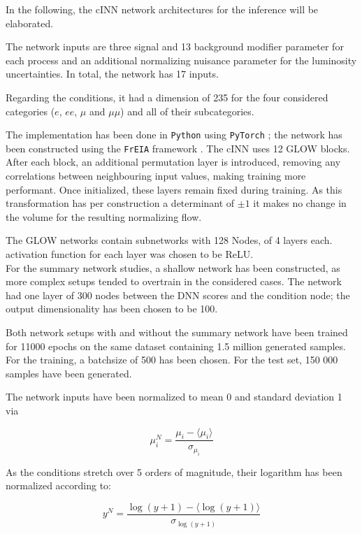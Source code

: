 
In the following, the cINN network architectures for the inference will be elaborated. 

The network inputs are three signal and 13 background modifier parameter for each process and an additional normalizing nuisance parameter for the luminosity uncertainties. In total, the network has 17 inputs.

Regarding the conditions, it had a dimension of 235 for the four considered categories ($e$, $ee$, $\mu$ and $\mu\mu$) and all of their subcategories.

The implementation has been done in \texttt{Python} using \texttt{PyTorch} \cite{pytorch}; the network has been constructed using the \texttt{FrEIA} framework \cite{freia}. The cINN uses 12 GLOW blocks. After each block, an additional permutation layer is introduced, removing any correlations between neighbouring input values, making training more performant. Once initialized, these layers remain fixed during training. As this transformation has per construction a determinant of $\pm1$ it makes no change in the volume for the resulting normalizing flow.

The GLOW networks contain subnetworks with 128 Nodes, of 4 layers each. activation function for each layer was chosen to be ReLU.\\

For the summary network studies, a shallow network has been constructed, as more complex setups tended to overtrain in the considered cases. The network had one layer of 300 nodes between the DNN scores and the condition node; the output dimensionality has been chosen to be 100.

Both network setups with and without the summary network have been trained for 11000 epochs on the same dataset containing 1.5 million generated samples. For the training, a batchsize of 500 has been chosen. For the test set, 150 000 samples have been generated.

The network inputs have been normalized to mean 0 and standard deviation 1 via

\begin{equation*}
	\mu^N_i = \frac{\mu_i - \langle\mu_i\rangle}{\sigma_{\mu_i}}
\end{equation*}

As the conditions stretch over 5 orders of magnitude, their logarithm has been normalized according to:

\begin{equation*}
	y^N = \frac{\log(y+1)-\langle\log(y+1)\rangle}{\sigma_{\log(y+1)}}
\end{equation*}

